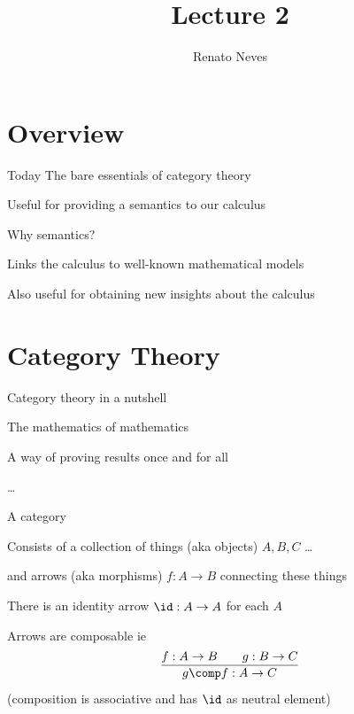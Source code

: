\documentclass{beamer}
\author[Renato Neves]{Renato Neves}
\date{}
\begin{document}
\title{Lecture 2}

\frame[plain]{\titlepage}

\section{Overview}

\begin{frame}{Today}
        The bare essentials of category theory


        \medskip
        Useful for providing a semantics to our calculus
\end{frame}

\begin{frame}{Why semantics?}

        Links the calculus to well-known mathematical models
                
        \medskip
        Also useful for obtaining new insights about the calculus
\end{frame}

\section{Category Theory}

\begin{frame}{Category theory in a nutshell}

        The mathematics of mathematics

        \medskip
        A way of proving results once and for all

        \medskip
        \dots
\end{frame}

\begin{frame}{A category}

        Consists of a collection of things (aka \alert{objects}) $A,B,C$ \dots

        \medskip
        and arrows (aka \alert{morphisms}) $f : A \to B$ connecting these things

        \pause
        \bigskip
        There is an \alert{identity} arrow $\id : A \to A$ for each $A$

        \pause
        \bigskip
        Arrows are \alert{composable} ie
        \[
                \infer{
                        g \comp f : A \to C
                }{
                        f : A \to B \qquad g : B \to C}
        \]
        \pause
        (composition is associative and has $\id$ as neutral element)
\end{frame}
\end{document}
